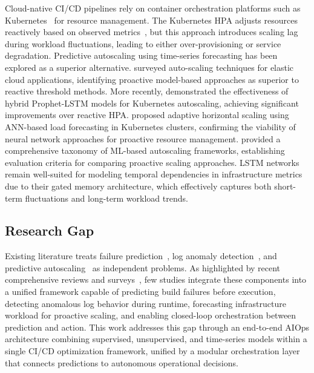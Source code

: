 \documentclass[a4paper,fleqn]{cas-dc}
\begin{document}
Cloud-native CI/CD pipelines rely on container orchestration platforms such as Kubernetes~\citep{burns2016borg} for resource management.
The Kubernetes HPA adjusts resources reactively based on observed metrics~\citep{kubernetesDocs}, but this approach introduces scaling lag during workload fluctuations, leading to either over-provisioning or service degradation.
Predictive autoscaling using time-series forecasting has been explored as a superior alternative.
\citet{lorido2014autoscaling} surveyed auto-scaling techniques for elastic cloud applications, identifying proactive model-based approaches as superior to reactive threshold methods.
More recently, \citet{guruge2025prophet} demonstrated the effectiveness of hybrid Prophet-LSTM models for Kubernetes autoscaling, achieving significant improvements over reactive HPA.
\citet{dasilva2025adaptive} proposed adaptive horizontal scaling using ANN-based load forecasting in Kubernetes clusters, confirming the viability of neural network approaches for proactive resource management.
\citet{machiraju2026mlautoscaling} provided a comprehensive taxonomy of ML-based autoscaling frameworks, establishing evaluation criteria for comparing proactive scaling approaches.
LSTM networks~\citep{hochreiter1997lstm} remain well-suited for modeling temporal dependencies in infrastructure metrics due to their gated memory architecture, which effectively captures both short-term fluctuations and long-term workload trends.

\subsection{Research Gap}\label{subsec:gap}

Existing literature treats failure prediction~\citep{chen2016xgboost, rausch2017empirical}, log anomaly detection~\citep{du2017deeplog, le2022log, liao2025logtransformer}, and predictive autoscaling~\citep{lorido2014autoscaling, guruge2025prophet} as independent problems.
As highlighted by recent comprehensive reviews and surveys~\citep{zota2025agentic, bayram2025trustworthy, machiraju2026mlautoscaling}, few studies integrate these components into a unified framework capable of predicting build failures before execution, detecting anomalous log behavior during runtime, forecasting infrastructure workload for proactive scaling, and enabling closed-loop orchestration between prediction and action.
This work addresses this gap through an end-to-end AIOps architecture combining supervised, unsupervised, and time-series models within a single CI/CD optimization framework, unified by a modular orchestration layer that connects predictions to autonomous operational decisions.
\end{document}

